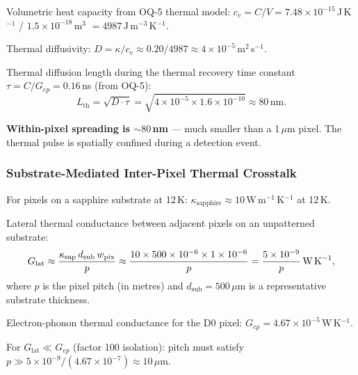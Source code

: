 Volumetric heat capacity from OQ-5 thermal model:
$c_v = C/V = 7.48 \times 10^{-15}$\,J\,K$^{-1}$ / $1.5 \times 10^{-18}$\,m$^3$
$= 4987$\,J\,m$^{-3}$\,K$^{-1}$. %

Thermal diffusivity: $D = \kappa / c_v \approx 0.20 / 4987 \approx 4 \times 10^{-5}$\,m$^2$\,s$^{-1}$.

Thermal diffusion length during the thermal recovery time constant
$\tau = C/G_{ep} = 0.16$\,ns (from OQ-5):
\begin{equation}
  L_\mathrm{th} = \sqrt{D \cdot \tau}
  = \sqrt{4 \times 10^{-5} \times 1.6 \times 10^{-10}}
  \approx 80\,\text{nm}.
  \label{eq:q3_L_th}
\end{equation}

\noindent\textbf{Within-pixel spreading is $\sim\!80$\,nm} --- much smaller than a 1\,$\mu$m
pixel. The thermal pulse is spatially confined during a detection event.

\subsubsection{Substrate-Mediated Inter-Pixel Thermal Crosstalk}
\label{sec:q3_inter}

For pixels on a sapphire substrate at 12\,K:
$\kappa_\mathrm{sapphire} \approx 10$\,W\,m$^{-1}$\,K$^{-1}$ at 12\,K.

Lateral thermal conductance between adjacent pixels on an unpatterned substrate:
\begin{equation}
  G_\mathrm{lat} \approx \frac{\kappa_\mathrm{sap}\,d_\mathrm{sub}\,w_\mathrm{pix}}{p}
  \approx \frac{10 \times 500 \times 10^{-6} \times 1 \times 10^{-6}}{p}
  = \frac{5 \times 10^{-9}}{p}\,\text{W\,K}^{-1},
  \label{eq:q3_G_lat}
\end{equation}
where $p$ is the pixel pitch (in metres) and $d_\mathrm{sub} = 500\,\mu$m is a
representative substrate thickness.

Electron-phonon thermal conductance for the D0 pixel:
$G_{ep} = 4.67 \times 10^{-5}$\,W\,K$^{-1}$.

For $G_\mathrm{lat} \ll G_{ep}$ (factor 100 isolation): pitch must satisfy
$p \gg 5 \times 10^{-9} / (4.67 \times 10^{-7}) \approx 10\,\mu$m.

